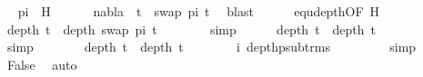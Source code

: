 \begin{isabellebody}
\ \isamarkupfalse%
\ pi\ \ H{\isacharcolon}{\kern0pt}\isanewline
\ \ \ \ \ \ {\isachardoublequoteopen}nabla\ {\isasymturnstile}\ t{}\ {\isasymapprox}\ swap\ pi\ t{}{\isachardoublequoteclose}\ \isamarkupfalse%
\ blast\isanewline
\isanewline
\ \ \ \ \isamarkupfalse%
\ equ{\isacharunderscore}{\kern0pt}depth{\isacharbrackleft}{\kern0pt}OF\ H{\isacharbrackright}{\kern0pt}\isanewline
\ \ \ \ \isamarkupfalse%
\ {\isachardoublequoteopen}depth\ t{}\ {\isacharequal}{\kern0pt}\ depth\ {\isacharparenleft}{\kern0pt}swap\ pi\ t{}{\isacharparenright}{\kern0pt}{\isachardoublequoteclose}\isanewline
\ \ \ \ \ \ \isamarkupfalse%
\ simp\isanewline
\ \ \ \ \isamarkupfalse%
\ {\isachardoublequoteopen}depth\ t{}\ {\isacharequal}{\kern0pt}\ depth\ t{}{\isachardoublequoteclose}\ \isanewline
\ \ \ \ \ \ \isamarkupfalse%
\ simp\isanewline
\ \ \ \ \isamarkupfalse%
\ \isamarkupfalse%
\ {\isachardoublequoteopen}depth\ t{}\ {\isacharless}{\kern0pt}\ depth\ t{}{\isachardoublequoteclose}\isanewline
\ \ \ \ \ \ \isamarkupfalse%
\ i\ depth{\isacharunderscore}{\kern0pt}psub{\isacharunderscore}{\kern0pt}trms\ \isanewline
\ \ \ \ \ \ \isamarkupfalse%
\ simp\isanewline
\isanewline
\ \ \ \ \isamarkupfalse%
\ \isamarkupfalse%
\ False\ \isamarkupfalse%
\ auto\isanewline
\ \ \isamarkupfalse%
\isanewline
{}\isamarkupfalse%
%
\endisatagproof
{\isafoldproof}%
%
\isadelimproof
\isanewline
%
\endisadelimproof
%
\isadelimtheory
\isanewline
%
\endisadelimtheory
%
\isatagtheory
{}\isamarkupfalse%
%
\endisatagtheory
{\isafoldtheory}%
%
\isadelimtheory
%
\endisadelimtheory
%
\end{isabellebody}%
\endinput
